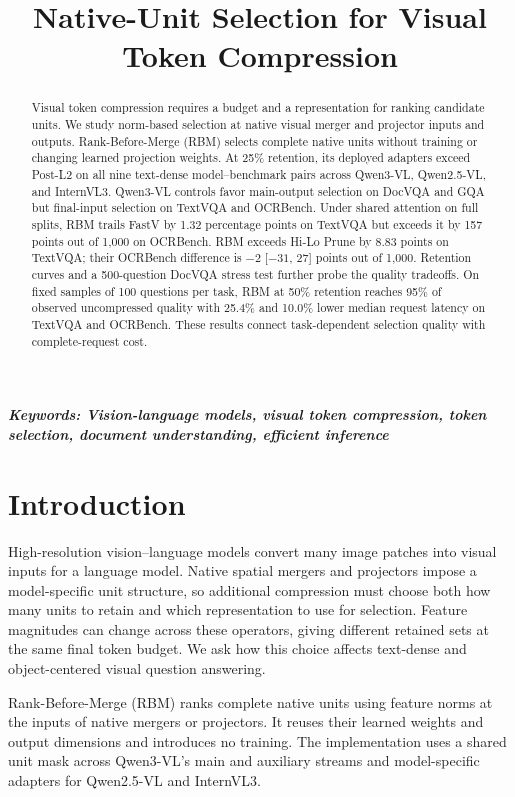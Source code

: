 \documentclass[10pt,twocolumn,letterpaper]{article}
\newcommand{\keywords}[1]{{\bf \emph{Keywords: #1}}}
\begin{document}
\title{Native-Unit Selection for Visual Token Compression}
\author{}
\maketitle

\begin{abstract}
Visual token compression requires a budget and a representation for ranking candidate units. We study norm-based selection at native visual merger and projector inputs and outputs. Rank-Before-Merge (RBM) selects complete native units without training or changing learned projection weights. At 25\% retention, its deployed adapters exceed Post-L2 on all nine text-dense model--benchmark pairs across Qwen3-VL, Qwen2.5-VL, and InternVL3. Qwen3-VL controls favor main-output selection on DocVQA and GQA but final-input selection on TextVQA and OCRBench. Under shared attention on full splits, RBM trails FastV by 1.32 percentage points on TextVQA but exceeds it by 157 points out of 1,000 on OCRBench. RBM exceeds Hi-Lo Prune by 8.83 points on TextVQA; their OCRBench difference is $-2$ [$-31$, 27] points out of 1,000. Retention curves and a 500-question DocVQA stress test further probe the quality tradeoffs. On fixed samples of 100 questions per task, RBM at 50\% retention reaches 95\% of observed uncompressed quality with 25.4\% and 10.0\% lower median request latency on TextVQA and OCRBench. These results connect task-dependent selection quality with complete-request cost.
\end{abstract}

\keywords{Vision-language models, visual token compression, token selection, document understanding, efficient inference}

\section{Introduction}
High-resolution vision--language models convert many image patches into visual inputs for a language model. Native spatial mergers and projectors impose a model-specific unit structure, so additional compression must choose both how many units to retain and which representation to use for selection. Feature magnitudes can change across these operators, giving different retained sets at the same final token budget. We ask how this choice affects text-dense and object-centered visual question answering.

Rank-Before-Merge (RBM) ranks complete native units using feature norms at the inputs of native mergers or projectors. It reuses their learned weights and output dimensions and introduces no training. The implementation uses a shared unit mask across Qwen3-VL's main and auxiliary streams and model-specific adapters for Qwen2.5-VL and InternVL3.
\end{document}
